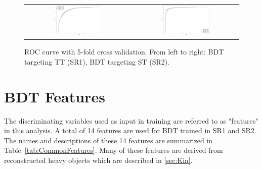 \begin{figure}[tbh!]
 \begin{center}
 \begin{tabular}{cc}
  \includegraphics[width=0.48\textwidth]{figures/Part3/BDT/5foldTT}&
    \includegraphics[width=0.48\textwidth]{figures/Part3/BDT/5foldST}\\
 \end{tabular}
 \caption{ROC curve with 5-fold cross validation. From left to right: BDT targeting TT (SR1), BDT targeting ST (SR2).}
 \label{fig:ROC}
 \end{center}
\end{figure}

\section{BDT Features}
\label{sec:Input}

The discriminating variables used as input in training are referred to as "features" in this analysis. A total of 14 features are used for \ac{BDT} trained in \ac{SR}1 and \ac{SR}2. The names and descriptions of these 14 features are summarized in Table~\ref{tab:CommonFeatures}. Many of these features are derived from reconstructed heavy objects which are described in \autoref{sec:Kin}.


